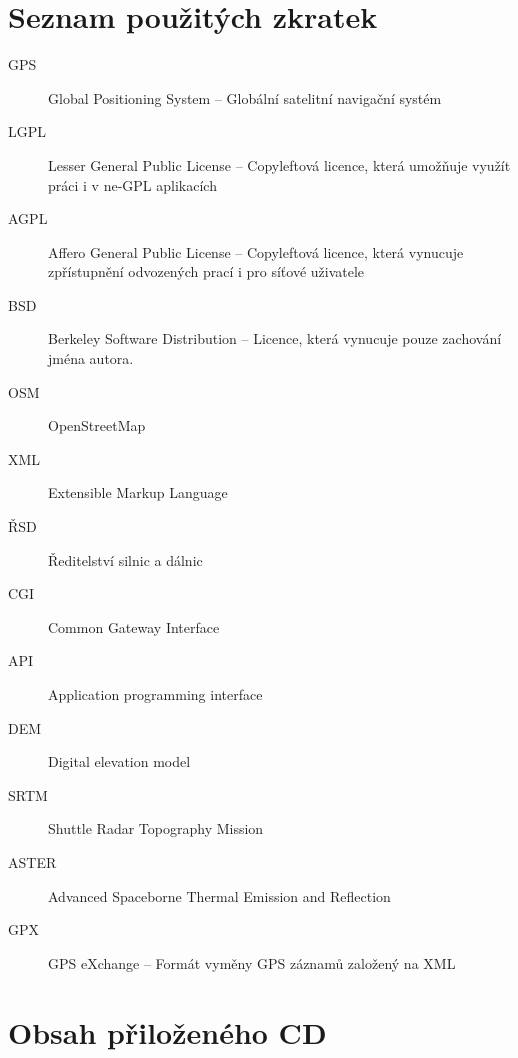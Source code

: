 \documentclass[thesis=B,czech]{FITthesis}[2012/06/26]
\begin{document}
\chapter{Seznam použitých zkratek}
\begin{description}
	\item[GPS] Global Positioning System -- Globální satelitní navigační systém
	\item[LGPL] Lesser General Public License -- Copyleftová licence, která umožňuje využít práci i v ne-GPL aplikacích
	\item[AGPL] Affero General Public License -- Copyleftová licence, která vynucuje zpřístupnění odvozených prací i pro síťové uživatele
	\item[BSD] Berkeley Software Distribution -- Licence, která vynucuje pouze zachování jména autora.
	\item[OSM] OpenStreetMap
	\item[XML] Extensible Markup Language
	\item[ŘSD] Ředitelství silnic a dálnic
	\item[CGI] Common Gateway Interface
	\item[API] Application programming interface
	\item[DEM] Digital elevation model 
	\item[SRTM] Shuttle Radar Topography Mission
	\item[ASTER] Advanced Spaceborne Thermal Emission and Reflection
	\item[GPX] GPS eXchange -- Formát vyměny GPS záznamů založený na XML
	
\end{description}


\chapter{Obsah přiloženého CD}


\begin{figure}
\end{figure}
\end{document}
